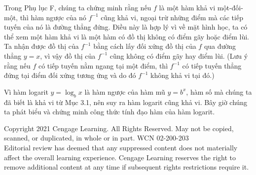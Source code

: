 \vspace{3mm}
Trong Phụ lục F, chúng ta chứng minh rằng nếu $f$ là một hàm khả vi một-đối-một, thì hàm ngược của nó $f^{-1}$ cũng khả vi, ngoại trừ những điểm mà các tiếp tuyến của nó là đường thẳng đứng. Điều này là hợp lý vì về mặt hình học, ta có thể xem một hàm khả vi là một hàm có đồ thị không có điểm gãy hoặc điểm lùi. Ta nhận được đồ thị của $f^{-1}$ bằng cách lấy đối xứng đồ thị của $f$ qua đường thẳng $y = x$, vì vậy đồ thị của $f^{-1}$ cũng không có điểm gãy hay điểm lùi. (Lưu ý rằng nếu $f$ có tiếp tuyến nằm ngang tại một điểm, thì $f^{-1}$ có tiếp tuyến thẳng đứng tại điểm đối xứng tương ứng và do đó $f^{-1}$ không khả vi tại đó.)

Vì hàm logarit $y = \log_b x$ là hàm ngược của hàm mũ $y = b^x$, hàm số mà chúng ta đã biết là khả vi từ Mục 3.1, nên suy ra hàm logarit cũng khả vi. Bây giờ chúng ta phát biểu và chứng minh công thức tính đạo hàm của hàm logarit.

\vspace{4mm}
\noindent
{}

\vfill
\begin{center}
  \fontsize{6.5}{8}\selectfont\color{gray}
  Copyright 2021 Cengage Learning. All Rights Reserved. May not be copied, scanned, or duplicated, in whole or in part. WCN 02-200-203\\[1pt]
  Editorial review has deemed that any suppressed content does not materially affect the overall learning experience. Cengage Learning reserves the right to remove additional content at any time if subsequent rights restrictions require it.
\end{center}
